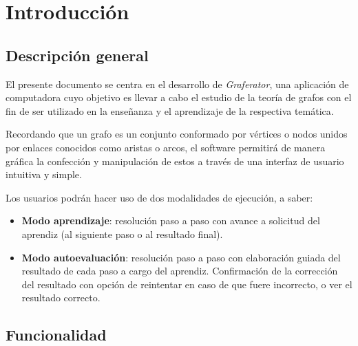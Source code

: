 \documentclass{book}
\begin{document}
\tableofcontents
\newpage
\thispagestyle{empty}
\thispagestyle{empty}
\thispagestyle{empty}



%
%
\chapter{Introducción}


\section{Descripción general}
	
	El presente documento se centra en el desarrollo de \textit{Graferator}, una aplicación de computadora cuyo objetivo es llevar a cabo el estudio de la teoría de grafos con el fin de ser utilizado en la enseñanza y el aprendizaje de la respectiva temática.
	\par
	Recordando que un grafo es un conjunto conformado por vértices o nodos unidos por enlaces conocidos como aristas o arcos, el software permitirá de manera gráfica la confección y manipulación de estos a través de una interfaz de usuario intuitiva y simple.
	\par
	Los usuarios podrán hacer uso de dos modalidades de ejecución, a saber:
	\medskip

	\begin{itemize}
		\renewcommand{\labelitemi}{\scriptsize\tiny$\blacksquare$} 
		\itemsep=10pt \topsep=0pt \partopsep=0pt \parskip=0pt \parsep=10pt
		
		\item \textbf{Modo aprendizaje}: resolución paso a paso con avance a solicitud del aprendiz (al siguiente paso o al resultado final).

		\item \textbf{Modo autoevaluación}: resolución paso a paso con elaboración guiada del resultado de cada paso a cargo del aprendiz. Confirmación de la corrección del resultado con opción de reintentar en caso de que fuere incorrecto, o ver el resultado correcto.

	\end{itemize}
	\medskip



\section{Funcionalidad}
\end{document}
